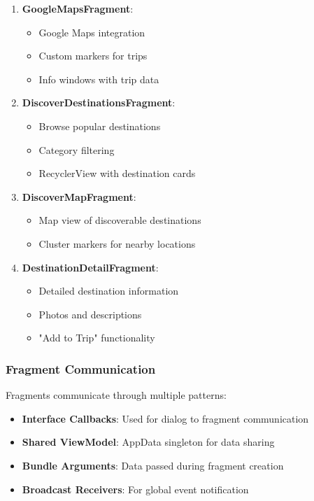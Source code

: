 \documentclass[12pt,a4paper]{article}
\begin{document}
\begin{enumerate}
    \item \textbf{GoogleMapsFragment}:
    \begin{itemize}
        \item Google Maps integration
        \item Custom markers for trips
        \item Info windows with trip data
    \end{itemize}

    \item \textbf{DiscoverDestinationsFragment}:
    \begin{itemize}
        \item Browse popular destinations
        \item Category filtering
        \item RecyclerView with destination cards
    \end{itemize}

    \item \textbf{DiscoverMapFragment}:
    \begin{itemize}
        \item Map view of discoverable destinations
        \item Cluster markers for nearby locations
    \end{itemize}

    \item \textbf{DestinationDetailFragment}:
    \begin{itemize}
        \item Detailed destination information
        \item Photos and descriptions
        \item "Add to Trip" functionality
    \end{itemize}
\end{enumerate}

\subsubsection{Fragment Communication}
Fragments communicate through multiple patterns:

\begin{itemize}
    \item \textbf{Interface Callbacks}: Used for dialog to fragment communication
    \item \textbf{Shared ViewModel}: AppData singleton for data sharing
    \item \textbf{Bundle Arguments}: Data passed during fragment creation
    \item \textbf{Broadcast Receivers}: For global event notification
\end{itemize}
\end{document}
